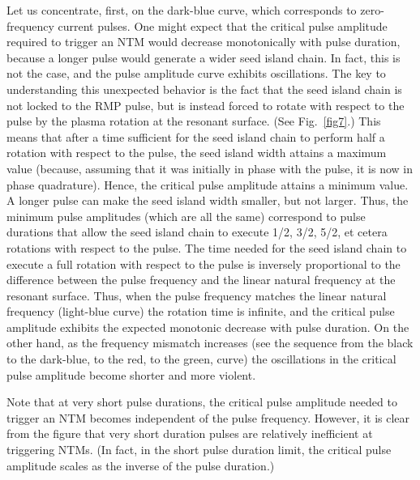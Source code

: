 \documentclass[12pt,prb,aps]{revtex4-1}
\begin{document}
Let us concentrate, first,  on the dark-blue curve, which corresponds to zero-frequency current pulses. One might expect that the critical pulse amplitude required to trigger an NTM would decrease monotonically with pulse duration, because a
longer pulse would generate a wider seed island chain. In fact, this is not the case, and the pulse amplitude curve exhibits oscillations. The key to understanding this unexpected behavior is the fact that the seed island chain is not locked to the RMP pulse, but is instead forced to rotate with respect to the pulse by the plasma rotation at the
resonant surface. (See Fig.~\ref{fig7}.) This means that after a time sufficient for the seed island chain to perform half a rotation with
respect to the pulse, the seed island width attains a maximum value (because, assuming that it was initially
in phase with the pulse,  it is now in phase quadrature). Hence, the critical pulse amplitude attains a
minimum value. A longer pulse can make the seed island width smaller, but not larger. Thus, the minimum pulse
amplitudes (which are all the same) correspond to pulse durations that allow the seed island chain to execute 1/2, 3/2, 5/2, et cetera rotations
with respect to the pulse. The time needed for the seed island chain to execute a full rotation with respect to the pulse is
inversely proportional to the difference between the pulse frequency and the linear natural frequency at the resonant surface. Thus, when the pulse frequency matches the linear natural frequency (light-blue curve) the rotation time is infinite, and
the critical pulse amplitude exhibits the expected monotonic decrease with pulse duration. On the other hand, as the
 frequency mismatch increases (see the sequence from the black to the dark-blue, to the red, to the green, curve) the oscillations in the critical pulse amplitude become shorter and
more violent. 

Note that at very short pulse durations, the critical pulse amplitude needed to trigger an NTM becomes independent
of the pulse frequency. However, it is clear from the figure that very short duration pulses are relatively inefficient at 
triggering NTMs. (In fact,  in the
 short pulse duration limit, the critical pulse amplitude scales as the inverse  of the pulse duration.) 
 
\end{document}
